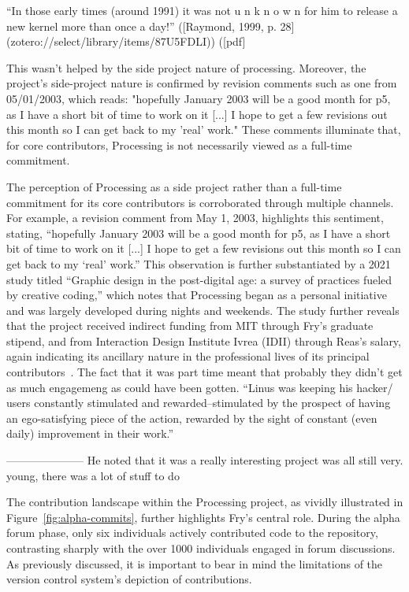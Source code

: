 “In those early times (around 1991) it was not u n k n o w n for him to release a new kernel more than once a day!” ([Raymond, 1999, p. 28](zotero://select/library/items/87U5FDLI)) ([pdf]

This wasn't helped by the side project nature of processing.  
Moreover, the project’s side-project nature is confirmed by revision comments such as one from 05/01/2003, which reads: "hopefully January 2003 will be a good month for p5, as I have a short bit of time to work on it [...] I hope to get a few revisions out this month so I can get back to my 'real' work." These comments illuminate that, for core contributors, Processing is not necessarily viewed as a full-time commitment.

The perception of Processing as a side project rather than a full-time commitment for its core contributors is corroborated through multiple channels. For example, a revision comment from May 1, 2003, highlights this sentiment, stating, ``hopefully January 2003 will be a good month for p5, as I have a short bit of time to work on it [...] I hope to get a few revisions out this month so I can get back to my `real' work.'' This observation is further substantiated by a 2021 study titled ``Graphic design in the post-digital age: a survey of practices fueled by creative coding,'' which notes that Processing began as a personal initiative and was largely developed during nights and weekends. The study further reveals that the project received indirect funding from MIT through Fry's graduate stipend, and from Interaction Design Institute Ivrea (IDII) through Reas's salary, again indicating its ancillary nature in the professional lives of its principal contributors~\parencite[396]{conradGraphicDesignPostdigital2021}.
The fact that it was part time meant that probably they didn't get as much engagemeng as could have been gotten.
“Linus was keeping his hacker/ users constantly stimulated and rewarded--stimulated by the prospect of having an ego-satisfying piece of the action, rewarded by the sight of constant (even daily) improvement in their work.”

---------------------
He noted that it was a really interesting project was all still very. young, there was a lot of stuff to do

The contribution landscape within the Processing project, as vividly illustrated in Figure~\ref{fig:alpha-commits}, further highlights Fry's central role. During the alpha forum phase, only six individuals actively contributed code to the repository, contrasting sharply with the over 1000 individuals engaged in forum discussions. As previously discussed, it is important to bear in mind the limitations of the version control system's depiction of contributions.

